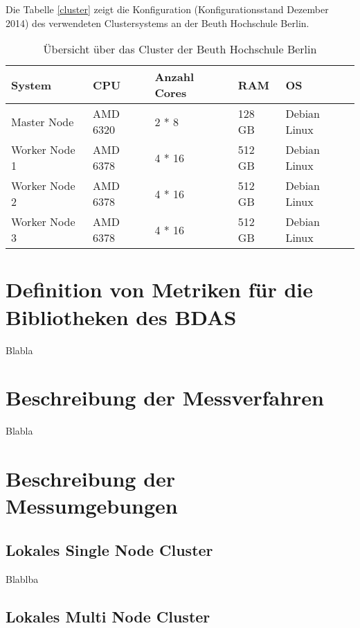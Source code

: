 Die Tabelle \ref{cluster} zeigt die Konfiguration (Konfigurationsstand Dezember 2014) des verwendeten Clustersystems an der Beuth Hochschule Berlin. 

\begin{table}[!ht]
\centering
\begin{tabular}{| p{3cm} | p{2.2cm} |  p{3cm} |  p{1.2cm} | p{3cm} | }
\hline
System & CPU & Anzahl Cores & RAM & OS\\ \hline \hline
Master Node & AMD 6320 & 2 * 8  & 128 GB & Debian Linux \\ \hline
Worker Node 1 & AMD 6378 & 4 * 16 & 512 GB &  Debian Linux\\ \hline
Worker Node 2 & AMD 6378 & 4 * 16 & 512 GB &  Debian Linux\\ \hline
Worker Node 3 & AMD 6378 & 4 * 16 & 512 GB &  Debian Linux\\ \hline

\end{tabular}
\caption{Übersicht über das Cluster der Beuth Hochschule Berlin}
	\label{tab:cluster}
\end{table}  



\section{Definition von Metriken für die Bibliotheken des BDAS}
\label{section:definition der metriken}

Blabla



\section{Beschreibung der Messverfahren}
\label{section:messumgebungen}

Blabla


\section{Beschreibung der Messumgebungen}
\label{section:messumgebungen}

\subsection{Lokales Single Node Cluster  }
\label{section:lokales single node}

Blablba

\subsection{Lokales Multi Node Cluster}
\label{section:tachyon}

